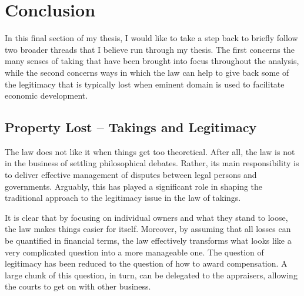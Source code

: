 \chapter{Conclusion}




In this final section of my thesis, I would like to take a step back to briefly follow two broader threads that I believe run through my thesis. The first concerns the many senses of taking that have been brought into focus throughout the analysis, while the second concerns ways in which the law can help to give back some of the legitimacy that is typically lost when eminent domain is used to facilitate economic development.

\section{Property Lost -- Takings and Legitimacy}

The law does not like it when things get too theoretical. After all, the law is not in the business of settling philosophical debates. Rather, its main responsibility is to deliver effective management of  disputes between legal persons and governments. Arguably, this has played a significant role in shaping the traditional approach to the legitimacy issue in the law of takings.

It is clear that by focusing on individual owners and what they stand to loose, the law makes things easier for itself. Moreover, by assuming that all losses can be quantified in financial terms, the law effectively transforms what looks like a very complicated question into a more manageable one. The question of legitimacy has been reduced to the question of how to award compensation. A large chunk of this question, in turn, can be delegated to the appraisers, allowing the courts to get on with other business.

